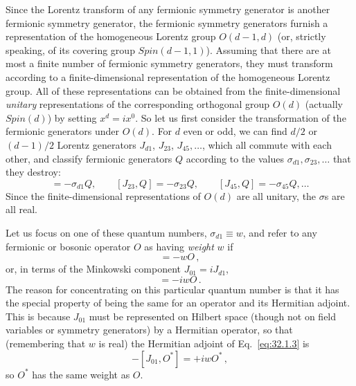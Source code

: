 Since the Lorentz transform of any fermionic symmetry generator is another
fermionic symmetry generator, the fermionic symmetry generators furnish a
representation of the homogeneous Lorentz group \(O(d-1,d)\) (or, strictly
speaking, of its covering group \(Spin(d-1,1)\)). Assuming that there are at
most a finite number of fermionic symmetry generators, they must transform
according to a finite-dimensional representation of the homogeneous Lorentz
group. All of these representations can be obtained from the
finite-dimensional \textit{unitary} representations of the corresponding
orthogonal group \(O(d)\) (actually \(Spin(d)\)) by setting \(x^d=ix^0\).
So let us first consider the transformation of the fermionic generators
under \(O(d)\). For \(d\) even or odd, we can find \(d/2\) or \((d-1)/2\)
Lorentz generators \(J_{d1}\), \(J_{23}\), \(J_{45},\ldots\), which all
commute with each other, and classify fermionic generators \(Q\) according
to the values \(\sigma_{d1},\sigma_{23},\ldots\) that they destroy:
\begin{equation}
  [J_{d1},Q]=-\sigma_{d1}Q,\qquad
  [J_{23},Q]=-\sigma_{23}Q,\qquad
  [J_{45},Q]=-\sigma_{45}Q,\ldots
  \tag{32.1.1}\label{eq:32.1.1}
\end{equation}
Since the finite-dimensional representations of \(O(d)\) are all unitary,
the \(\sigma\)s are all real.

Let us focus on one of these quantum numbers, \(\sigma_{d1}\equiv w\), and
refer to any fermionic or bosonic operator \(O\) as having \textit{weight}
\(w\) if
\begin{equation}
  [J_{d1},O]=-wO\,,
  \tag{32.1.2}\label{eq:32.1.2}
\end{equation}
or, in terms of the Minkowski component \(J_{01}=iJ_{d1}\),
\begin{equation}
  [J_{01},O]=-iwO\,.
  \tag{32.1.3}\label{eq:32.1.3}
\end{equation}
The reason for concentrating on this particular quantum number is that it
has the special property of being the same for an operator and its Hermitian
adjoint. This is because \(J_{01}\) must be represented on Hilbert space
(though not on field variables or symmetry generators) by a Hermitian
operator, so that (remembering that \(w\) is real) the Hermitian adjoint of
Eq.~\eqref{eq:32.1.3} is
\begin{equation}
  -[J_{01},O^*]=+iwO^*\,,
  \tag{32.1.4}\label{eq:32.1.4}
\end{equation}
so \(O^*\) has the same weight as \(O\).

